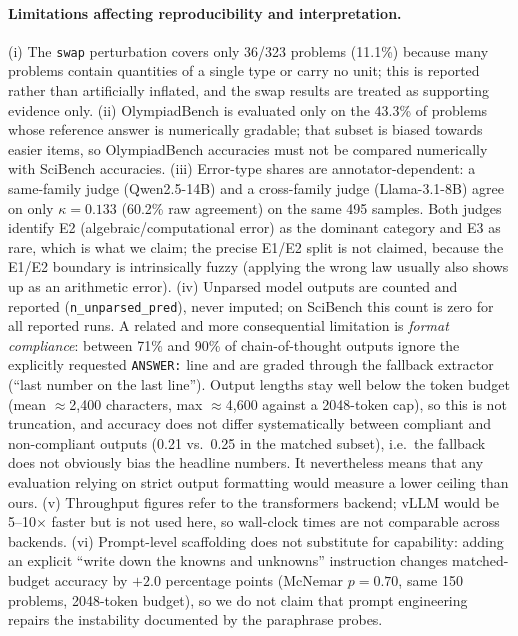 \paragraph{Limitations affecting reproducibility and interpretation.}
(i) The \texttt{swap} perturbation covers only 36/323 problems (11.1\%) because
many problems contain quantities of a single type or carry no unit; this is
reported rather than artificially inflated, and the swap results are treated as
supporting evidence only.
(ii) OlympiadBench is evaluated only on the 43.3\% of problems whose reference
answer is numerically gradable; that subset is biased towards easier items, so
OlympiadBench accuracies must not be compared numerically with SciBench
accuracies.
(iii) Error-type shares are annotator-dependent: a same-family judge
(Qwen2.5-14B) and a cross-family judge (Llama-3.1-8B) agree on only
$\kappa=0.133$ (60.2\% raw agreement) on the same 495 samples. Both judges
identify E2 (algebraic/computational error) as the dominant category and E3 as
rare, which is what we claim; the precise E1/E2 split is not claimed, because the
E1/E2 boundary is intrinsically fuzzy (applying the wrong law usually also
shows up as an arithmetic error).
(iv) Unparsed model outputs are counted and reported
(\texttt{n\_unparsed\_pred}), never imputed; on SciBench this count is zero for
all reported runs. A related and more consequential limitation is \emph{format
compliance}: between 71\% and 90\% of chain-of-thought outputs ignore the
explicitly requested \texttt{ANSWER:} line and are graded through the fallback
extractor (``last number on the last line''). Output lengths stay well below the
token budget (mean $\approx$2{,}400 characters, max $\approx$4{,}600 against a
2048-token cap), so this is not truncation, and accuracy does not differ
systematically between compliant and non-compliant outputs (0.21 vs.\ 0.25 in the
matched subset), i.e.\ the fallback does not obviously bias the headline numbers.
It nevertheless means that any evaluation relying on strict output formatting
would measure a lower ceiling than ours.
(v) Throughput figures refer to the transformers backend; vLLM would be
5--10$\times$ faster but is not used here, so wall-clock times are not
comparable across backends.
(vi) Prompt-level scaffolding does not substitute for capability: adding an
explicit ``write down the knowns and unknowns'' instruction changes matched-budget
accuracy by $+2.0$ percentage points (McNemar $p=0.70$, same 150 problems,
2048-token budget), so we do not claim that prompt engineering repairs the
instability documented by the paraphrase probes.
